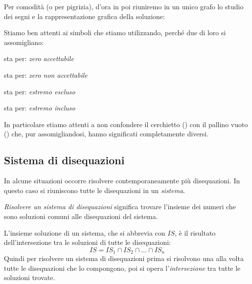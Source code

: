 \begin{osservazione}{}{} 
Per comodità (o per pigrizia), d'ora in poi riuniremo in un unico grafo 
lo studio dei segni e la rappresentazione grafica della soluzione: 

% 
{\soluzionefratta}
\end{osservazione}

Stiamo ben attenti ai simboli che stiamo utilizzando, perché due di loro si 
assomigliano:
\begin{htmulticols}{2}
%  
sta per: \emph{zero accettabile}

%  
sta per: \emph{zero non accettabile}

%  
sta per: \emph{estremo escluso}

%  
sta per: \emph{estremo incluso}
\end{htmulticols}

In particolare stiamo attenti a non confondere il cerchietto 
() 
con il pallino vuoto () che, pur assomigliandosi, 
hanno significati completamente diversi.

\subsection{Sistema di disequazioni}
\label{sec:dis_sistemi}

In alcune situazioni occorre risolvere contemporaneamente più disequazioni.
In questo caso si riuniscono tutte le disequazioni in un \emph{sistema}. 

\emph{Risolvere un sistema di disequazioni} significa trovare
l'insieme dei numeri che sono soluzioni comuni alle disequazioni del sistema.

L'insieme soluzione di un sistema, che si abbrevia con \(IS\), è 
il risultato dell'intersezione tra le soluzioni di tutte le disequazioni:
\[IS = IS_{1} \cap IS_{2} \cap \dots \cap IS_{n}\]
Quindi per risolvere un sistema di disequazioni prima si risolvono una alla 
volta tutte le disequazioni che lo compongono, 
poi si opera l'\emph{intersezione} tra tutte le soluzioni trovate. 

